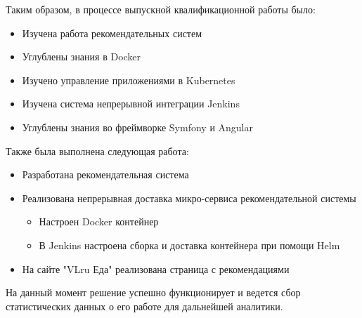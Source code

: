 Таким образом, в процессе выпускной квалификационной работы было:
\begin{itemize}
  \item Изучена работа рекомендательных систем
  \item Углублены знания в Docker
  \item Изучено управление приложениями в Kubernetes
  \item Изучена система непрерывной интеграции Jenkins
  \item Углублены знания во фреймворке Symfony и Angular
\end{itemize}
Также была выполнена следующая работа:
\begin{itemize}
  \item Разработана рекомендательная система
  \item Реализована непрерывная доставка микро-сервиса рекомендательной системы
    \begin{itemize}
      \item Настроен Docker контейнер
      \item В Jenkins настроена сборка и доставка контейнера при помощи Helm
    \end{itemize}
  \item На сайте "VLru Еда" реализована страница с рекомендациями
\end{itemize}
На данный момент решение успешно функционирует и ведется сбор статистических
данных о его работе для дальнейшей аналитики.
